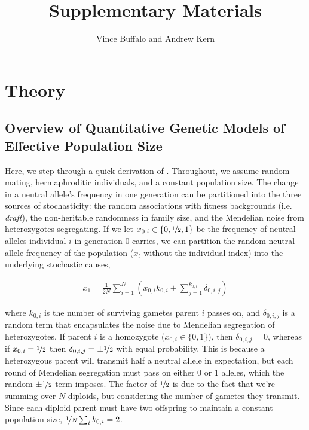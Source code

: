 \documentclass[11pt]{article}
\title{Supplementary Materials}
\author{Vince Buffalo and Andrew Kern}
\begin{document}
\maketitle

\tableofcontents

\section{Theory}
\subsection{Overview of Quantitative Genetic Models of Effective Population Size}

Here, we step through a quick derivation of \textcite{Santiago1995-hx}.
Throughout, we assume random mating, hermaphroditic individuals, and a constant
population size. The change in a neutral allele's frequency in one generation
can be partitioned into the three sources of stochasticity: the random
associations with fitness backgrounds (i.e. \emph{draft}), the non-heritable
randomness in family size, and the Mendelian noise from heterozygotes
segregating. If we let $x_{0,i} \in \{0, \nicefrac{1}{2}, 1\}$ be the frequency
of neutral alleles individual $i$ in generation 0 carries, we can partition the
random neutral allele frequency of the population ($x_t$ without the individual
index) into the underlying stochastic causes,

\begin{align}
  x_1 = \frac{1}{2N} \sum_{i=1}^N \left( x_{0,i}k_{0,i} + \sum_{j=1}^{k_{0,i}} \delta_{0,i,j} \right)
\end{align}

where $k_{0,i}$ is the number of surviving gametes parent $i$ passes on, and
$\delta_{0,i,j}$ is a random term that encapsulates the noise due to Mendelian
segregation of heterozygotes. If parent $i$ is a homozygote ($x_{0,i} \in \{0,
1\}$), then $\delta_{0,i,j} = 0$, whereas if $x_{0,i} = \nicefrac{1}{2}$ then
$\delta_{0,i,j} = \pm \nicefrac{1}{2}$ with equal probability. This is because
a heterozygous parent will transmit half a neutral allele in expectation, but
each round of Mendelian segregation must pass on either 0 or 1 alleles, which
the random $\pm \nicefrac{1}{2}$ term imposes. The factor of $\nicefrac{1}{2}$
is due to the fact that we're summing over $N$ diploids, but considering the
number of gametes they transmit. Since each diploid parent must have two
offspring to maintain a constant population size, $\nicefrac{1}{N} \sum_i
k_{0,i} = 2$. 
\end{document}
